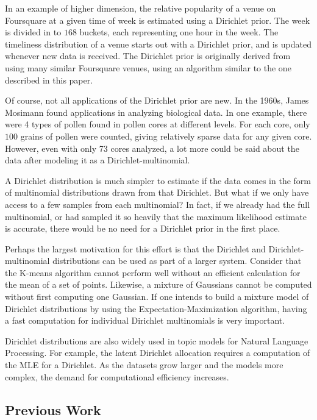 \documentclass[twoside]{article}
\begin{document}
In an example of higher dimension, the relative popularity of a venue on Foursquare at a given time of week is estimated using a Dirichlet prior\cite{sklar}.  The week is divided in to $168$ buckets, each representing one hour in the week.  The timeliness distribution of a venue starts out with a Dirichlet prior, and is updated whenever new data is received.  The Dirichlet prior is originally derived from using many similar Foursquare venues, using an algorithm similar to the one described in this paper.

Of course, not all applications of the Dirichlet prior are new.  In the 1960s, James Mosimann found applications in analyzing biological data\cite{mosimann}.  In one example, there were 4 types of pollen found in pollen cores at different levels.  For each core, only $100$ grains of pollen were counted, giving relatively sparse data for any given core.  However, even with only 73 cores analyzed, a lot more could be said about the data after modeling it as a Dirichlet-multinomial\cite[pg 8]{ng}\cite{mosimann}.

A Dirichlet distribution is much simpler to estimate if the data comes in the form of multinomial distributions drawn from that Dirichlet.  But what if we only have access to a few samples from each multinomial?  In fact, if we already had the full multinomial, or had sampled it so heavily that the maximum likelihood estimate is accurate, there would be no need for a Dirichlet prior in the first place.

Perhaps the largest motivation for this effort is that the Dirichlet and Dirichlet-multinomial distributions can be used as part of a larger system. Consider that the K-means algorithm cannot perform well without an efficient calculation for the mean of a set of points. Likewise, a mixture of Gaussians cannot be computed without first computing one Gaussian.  If one intends to build a mixture model of Dirichlet distributions by using the Expectation-Maximization algorithm, having a fast computation for individual Dirichlet multinomials is very important.

Dirichlet distributions are also widely used in topic models for Natural Language Processing.  For example, the latent Dirichlet allocation requires a computation of the MLE for a Dirichlet\cite{blei}\cite{heinrich}\cite{wallach}.  As the datasets grow larger and the models more complex, the demand for computational efficiency increases.  

\subsection{Previous Work}
\end{document}
